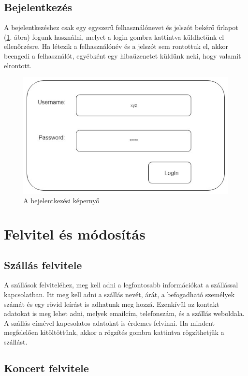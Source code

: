 \subsection{Bejelentkezés}

A bejelentkezéshez csak egy egyszerű felhasználónevet és jelszót bekérő űrlapot (\ref{fig:login}. ábra) fogunk használni, melyet a login gombra kattintva küldhetünk el ellenőrzésre. Ha létezik a felhasználónév és a jelszót sem rontottuk el, akkor beengedi a felhasználót, egyébként egy hibaüzenetet küldünk neki, hogy valamit elrontott.

\begin{figure}
\centering
\includegraphics[scale=0.5]{kepek/login.jpg}
\caption{A bejelentkezési képernyő}
\label{fig:login}
\end{figure}

\section{Felvitel és módosítás}

\subsection{Szállás felvitele}

A szállások felviteléhez, meg kell adni a legfontosabb információkat a szállással kapcsolatban. Itt meg kell adni a szállás nevét, árát, a befogadható személyek számát és egy rövid leírást is adhatunk meg hozzá. Ezenkívül az kontakt adatokat is meg lehet adni, melyek emailcím, telefonszám, és a szállás weboldala. A szállás címével kapcsolatos adatokat is érdemes felvinni. Ha mindent megfelelően kitöltöttünk, akkor a    rögzítés gombra kattintva rögzíthetjük a szállást.

\subsection{Koncert felvitele}

